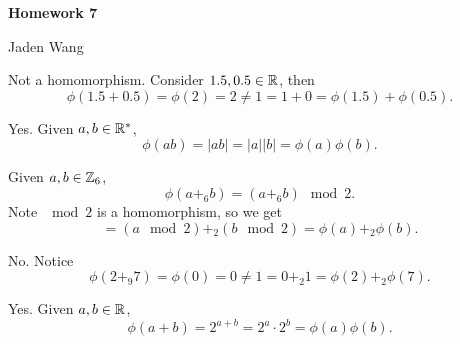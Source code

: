 \documentclass[12pt]{article}
\begin{document}
\centerline {\textsf{\textbf{\LARGE{Homework 7}}}}
\centerline {Jaden Wang}
\vspace{.15in}

\begin{problem}[13.2]
Not a homomorphism. Consider $ 1.5, 0.5 \in \mathbb{R}$, then
\[
	\phi(1.5+0.5) = \phi(2)=2 \neq 1 = 1+0= \phi(1.5) + \phi(0.5)
.\] 
\end{problem}

\begin{problem}[13.3]
Yes. Given $ a,b \in \mathbb{R}^* $, 
\[
\phi(ab) = |ab| = |a||b| = \phi(a) \phi(b)   
.\] 
\end{problem}
\begin{problem}[13.4]
Given $ a,b \in \mathbb{Z}_6$,
\[
	\phi(a+_{ 6} b) = (a+_{ 6} b) \mod 2
.\]
Note $ \mod 2$ is a homomorphism, so we get
\[
	= (a \mod 2) +_{ 2} (b \mod 2) = \phi(a) +_{ 2} \phi(b)  
.\]
\end{problem}

\begin{problem}[13.5]
No. Notice
\[
\phi(2+_{ 9} 7) = \phi(0) = 0 \neq 1 = 0+_{ 2} 1 = \phi(2)+_{ 2} \phi(7)      
.\] 
\end{problem}

\begin{problem}[13.6]
Yes. Given $ a,b \in \mathbb{R}$,
\[
\phi(a+b)= 2^{a+b}=2^{a} \cdot 2^{b} = \phi(a) \phi(b)   
.\] 
\end{problem}
\end{document}
